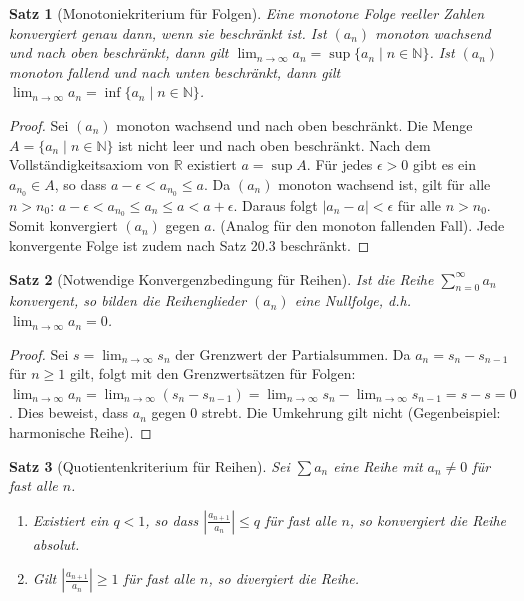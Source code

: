 \documentclass{article}
\newtheorem{satz}{Satz}[section]
\theoremstyle{definition}
\begin{document}
\begin{satz}[Monotoniekriterium für Folgen]
Eine monotone Folge reeller Zahlen konvergiert genau dann, wenn sie beschränkt ist.
Ist $(a_n)$ monoton wachsend und nach oben beschränkt, dann gilt $\lim_{n \to \infty} a_n = \sup \{ a_n \mid n \in \mathbb{N} \}$.
Ist $(a_n)$ monoton fallend und nach unten beschränkt, dann gilt $\lim_{n \to \infty} a_n = \inf \{ a_n \mid n \in \mathbb{N} \}$.


\end{satz}
\begin{proof}
Sei $(a_n)$ monoton wachsend und nach oben beschränkt. Die Menge $A = \{ a_n \mid n \in \mathbb{N} \}$ ist nicht leer und nach oben beschränkt. Nach dem Vollständigkeitsaxiom von $\mathbb{R}$ existiert $a = \sup A$.
Für jedes $\epsilon > 0$ gibt es ein $a_{n_0} \in A$, so dass $a - \epsilon < a_{n_0} \le a$.
Da $(a_n)$ monoton wachsend ist, gilt für alle $n > n_0$:
$a - \epsilon < a_{n_0} \le a_n \le a < a + \epsilon$.
Daraus folgt $|a_n - a| < \epsilon$ für alle $n > n_0$. 
Somit konvergiert $(a_n)$ gegen $a$.
(Analog für den monoton fallenden Fall).
Jede konvergente Folge ist zudem nach Satz 20.3 beschränkt.
\end{proof}
\begin{satz}[Notwendige Konvergenzbedingung für Reihen]
Ist die Reihe $\sum_{n=0}^\infty a_n$ konvergent, so bilden die Reihenglieder $(a_n)$ eine Nullfolge, d.h.
$\lim_{n \to \infty} a_n = 0$.


\end{satz}
\begin{proof}
Sei $s = \lim_{n \to \infty} s_n$ der Grenzwert der Partialsummen. Da $a_n = s_n - s_{n-1}$ für $n \ge 1$ gilt, folgt mit den Grenzwertsätzen für Folgen:
$\lim_{n \to \infty} a_n = \lim_{n \to \infty} (s_n - s_{n-1}) = \lim_{n \to \infty} s_n - \lim_{n \to \infty} s_{n-1} = s - s = 0$.
Dies beweist, dass $a_n$ gegen 0 strebt. Die Umkehrung gilt nicht (Gegenbeispiel: harmonische Reihe).
\end{proof}
\begin{satz}[Quotientenkriterium für Reihen]
Sei $\sum a_n$ eine Reihe mit $a_n \neq 0$ für fast alle $n$.
\begin{enumerate}[label=\arabic*.]
    \item Existiert ein $q < 1$, so dass $|\frac{a_{n+1}}{a_n}| \le q$ für fast alle $n$, so konvergiert die Reihe absolut.
    \item Gilt $|\frac{a_{n+1}}{a_n}| \ge 1$ für fast alle $n$, so divergiert die Reihe.
\end{enumerate}


\end{satz}
\end{document}
